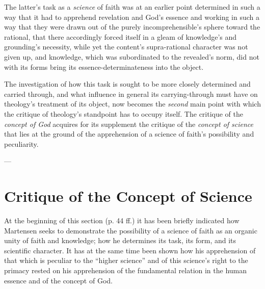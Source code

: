 \documentclass[12pt,a4paper]{book}
\begin{document}
The latter's task as a \emph{science} of faith was at an earlier point determined in such a way that
it had to apprehend revelation and God's essence and working in such a way that they were drawn
out of the purely incomprehensible's sphere toward the rational, that there accordingly forced
itself in a gleam of knowledge's and grounding's necessity, while yet the content's
supra-rational character was not given up, and knowledge, which was subordinated to the
revealed's norm, did not with its forms bring its essence-determinateness into the object.

The investigation of how this task is sought to be more closely determined and carried through,
and what influence in general its carrying-through must have on theology's treatment of its
object, now becomes the \emph{second} main point with which the critique of theology's standpoint has
to occupy itself. The critique of the \emph{concept of God} acquires for its supplement the critique
of the \emph{concept of science} that lies at the ground of the apprehension of a science of faith's
possibility and peculiarity.

\begin{center}---\end{center}

\section{Critique of the Concept of Science}
\label{sec:science-concept}

At the beginning of this section (p. 44 ff.) it has been briefly indicated how Martensen
seeks to demonstrate the possibility of a science of faith as an organic unity of faith
and knowledge; how he determines its task, its form, and its scientific character. It has
at the same time been shown how his apprehension of that which is peculiar to the ``higher
science'' and of this science's right to the primacy rested on his apprehension of the
fundamental relation in the human essence and of the concept of God.
\end{document}
